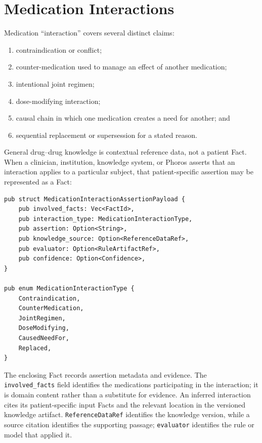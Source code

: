 \documentclass[11pt]{article}
\newcommand{\field}[1]{\texttt{#1}}
\begin{document}
\section{Medication Interactions}
\label{sec:interactions}

Medication ``interaction'' covers several distinct claims:

\begin{enumerate}[noitemsep]
  \item contraindication or conflict;
  \item counter-medication used to manage an effect of another medication;
  \item intentional joint regimen;
  \item dose-modifying interaction;
  \item causal chain in which one medication creates a need for another; and
  \item sequential replacement or supersession for a stated reason.
\end{enumerate}

General drug--drug knowledge is contextual reference data, not a patient Fact.
When a clinician, institution, knowledge system, or Phoros asserts that an
interaction applies to a particular subject, that patient-specific assertion
may be represented as a Fact:

\begin{lstlisting}
pub struct MedicationInteractionAssertionPayload {
    pub involved_facts: Vec<FactId>,
    pub interaction_type: MedicationInteractionType,
    pub assertion: Option<String>,
    pub knowledge_source: Option<ReferenceDataRef>,
    pub evaluator: Option<RuleArtifactRef>,
    pub confidence: Option<Confidence>,
}

pub enum MedicationInteractionType {
    Contraindication,
    CounterMedication,
    JointRegimen,
    DoseModifying,
    CausedNeedFor,
    Replaced,
}
\end{lstlisting}

The enclosing Fact records assertion metadata and evidence. The
\field{involved\_facts} field identifies the medications participating in the
interaction; it is domain content rather than a substitute for evidence. An
inferred interaction cites its patient-specific input Facts and the relevant
location in the versioned knowledge artifact. \field{ReferenceDataRef}
identifies the knowledge version, while a source citation identifies the
supporting passage; \field{evaluator} identifies the rule or model that applied
it.
\end{document}
